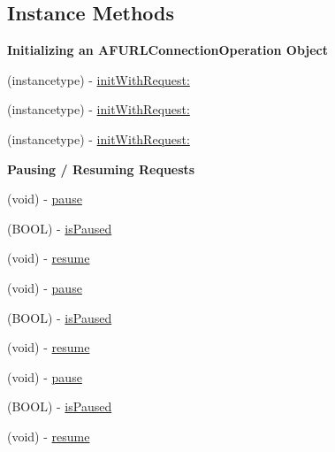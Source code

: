 \subsection*{Instance Methods}
\begin{Indent}\textbf{ Initializing an A\+F\+U\+R\+L\+Connection\+Operation Object}\par
{\em 

 

 }\begin{DoxyCompactItemize}
\item 
(instancetype) -\/ \mbox{\hyperlink{interface_a_f_u_r_l_connection_operation_aa9923ab9910d684883ff1098b0db9e35}{init\+With\+Request\+:}}
\item 
(instancetype) -\/ \mbox{\hyperlink{interface_a_f_u_r_l_connection_operation_aa9923ab9910d684883ff1098b0db9e35}{init\+With\+Request\+:}}
\item 
(instancetype) -\/ \mbox{\hyperlink{interface_a_f_u_r_l_connection_operation_aa9923ab9910d684883ff1098b0db9e35}{init\+With\+Request\+:}}
\end{DoxyCompactItemize}
\end{Indent}
\begin{Indent}\textbf{ Pausing / Resuming Requests}\par
{\em 

 

 }\begin{DoxyCompactItemize}
\item 
(void) -\/ \mbox{\hyperlink{interface_a_f_u_r_l_connection_operation_a7f895d00bdf837f67b959a3bf1bc37a2}{pause}}
\item 
(B\+O\+OL) -\/ \mbox{\hyperlink{interface_a_f_u_r_l_connection_operation_a7fbb0a649a549bf21234c02c556c61f9}{is\+Paused}}
\item 
(void) -\/ \mbox{\hyperlink{interface_a_f_u_r_l_connection_operation_ae67c1478ba17af4426ca7152251da473}{resume}}
\item 
(void) -\/ \mbox{\hyperlink{interface_a_f_u_r_l_connection_operation_a7f895d00bdf837f67b959a3bf1bc37a2}{pause}}
\item 
(B\+O\+OL) -\/ \mbox{\hyperlink{interface_a_f_u_r_l_connection_operation_a7fbb0a649a549bf21234c02c556c61f9}{is\+Paused}}
\item 
(void) -\/ \mbox{\hyperlink{interface_a_f_u_r_l_connection_operation_ae67c1478ba17af4426ca7152251da473}{resume}}
\item 
(void) -\/ \mbox{\hyperlink{interface_a_f_u_r_l_connection_operation_a7f895d00bdf837f67b959a3bf1bc37a2}{pause}}
\item 
(B\+O\+OL) -\/ \mbox{\hyperlink{interface_a_f_u_r_l_connection_operation_a7fbb0a649a549bf21234c02c556c61f9}{is\+Paused}}
\item 
(void) -\/ \mbox{\hyperlink{interface_a_f_u_r_l_connection_operation_ae67c1478ba17af4426ca7152251da473}{resume}}
\end{DoxyCompactItemize}
\end{Indent}
